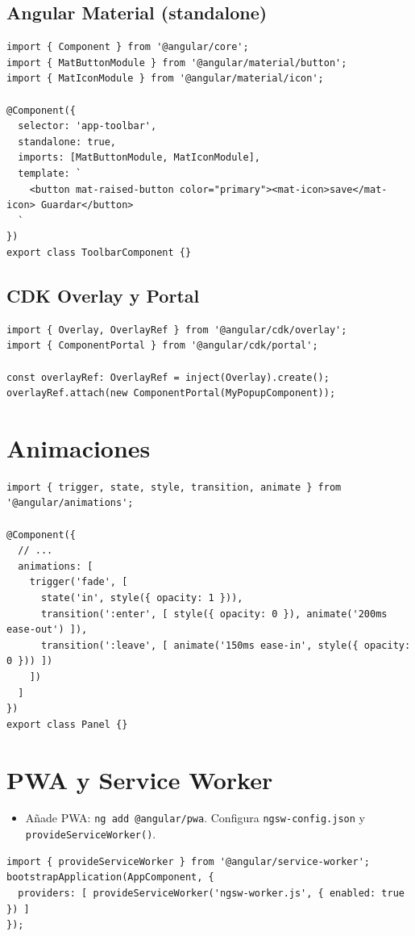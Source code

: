 \documentclass[11pt,a4paper]{article}
\begin{document}
\subsection{Angular Material (standalone)}
\begin{lstlisting}[style=tsstyle, caption={Uso de Material en standalone}]
import { Component } from '@angular/core';
import { MatButtonModule } from '@angular/material/button';
import { MatIconModule } from '@angular/material/icon';

@Component({
  selector: 'app-toolbar',
  standalone: true,
  imports: [MatButtonModule, MatIconModule],
  template: `
    <button mat-raised-button color="primary"><mat-icon>save</mat-icon> Guardar</button>
  `
})
export class ToolbarComponent {}
\end{lstlisting}

\subsection{CDK Overlay y Portal}
\begin{lstlisting}[style=tsstyle, caption={Overlay básico con CDK}]
import { Overlay, OverlayRef } from '@angular/cdk/overlay';
import { ComponentPortal } from '@angular/cdk/portal';

const overlayRef: OverlayRef = inject(Overlay).create();
overlayRef.attach(new ComponentPortal(MyPopupComponent));
\end{lstlisting}

\section{Animaciones}
\begin{lstlisting}[style=tsstyle, caption={Trigger con estados y transiciones}]
import { trigger, state, style, transition, animate } from '@angular/animations';

@Component({
  // ...
  animations: [
    trigger('fade', [
      state('in', style({ opacity: 1 })),
      transition(':enter', [ style({ opacity: 0 }), animate('200ms ease-out') ]),
      transition(':leave', [ animate('150ms ease-in', style({ opacity: 0 })) ])
    ])
  ]
})
export class Panel {}
\end{lstlisting}

\section{PWA y Service Worker}
\begin{itemize}[leftmargin=*]
  \item Añade PWA: \texttt{ng add @angular/pwa}. Configura \texttt{ngsw-config.json} y \texttt{provideServiceWorker()}.
\end{itemize}
\begin{lstlisting}[style=tsstyle, caption={Bootstrap con Service Worker}]
import { provideServiceWorker } from '@angular/service-worker';
bootstrapApplication(AppComponent, {
  providers: [ provideServiceWorker('ngsw-worker.js', { enabled: true }) ]
});
\end{lstlisting}
\end{document}
